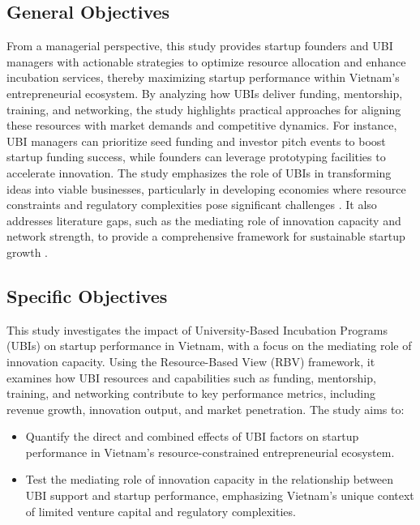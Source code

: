 \documentclass[../Main.tex]{subfiles}
\begin{document}
	\subsection{General Objectives}
	\label{subsection:1.2.1_General_objectives}
	    From a managerial perspective, this study provides startup founders and UBI managers with actionable strategies to optimize resource allocation and enhance incubation services, thereby maximizing startup performance within Vietnam's entrepreneurial ecosystem. By analyzing how UBIs deliver funding, mentorship, training, and networking, the study highlights practical approaches for aligning these resources with market demands and competitive dynamics. For instance, UBI managers can prioritize seed funding and investor pitch events to boost startup funding success, while founders can leverage prototyping facilities to accelerate innovation. The study emphasizes the role of UBIs in transforming ideas into viable businesses, particularly in developing economies where resource constraints and regulatory complexities pose significant challenges \autocite{smith2023}. It also addresses literature gaps, such as the mediating role of innovation capacity and network strength, to provide a comprehensive framework for sustainable startup growth \autocite{jones2022}.

	\subsection{Specific Objectives}
	\label{subsection:1.2.2_Specific_objectives}
	This study investigates the impact of University-Based Incubation Programs (UBIs) on startup performance in Vietnam, with a focus on the mediating role of innovation capacity. Using the Resource-Based View (RBV) framework, it examines how UBI resources and capabilities such as funding, mentorship, training, and networking contribute to key performance metrics, including revenue growth, innovation output, and market penetration. The study aims to:
	\begin{itemize}
		\item Quantify the direct and combined effects of UBI factors on startup performance in Vietnam's resource-constrained entrepreneurial ecosystem.
		\item Test the mediating role of innovation capacity in the relationship between UBI support and startup performance, emphasizing Vietnam's unique context of limited venture capital and regulatory complexities.
	\end{itemize}
\end{document}
